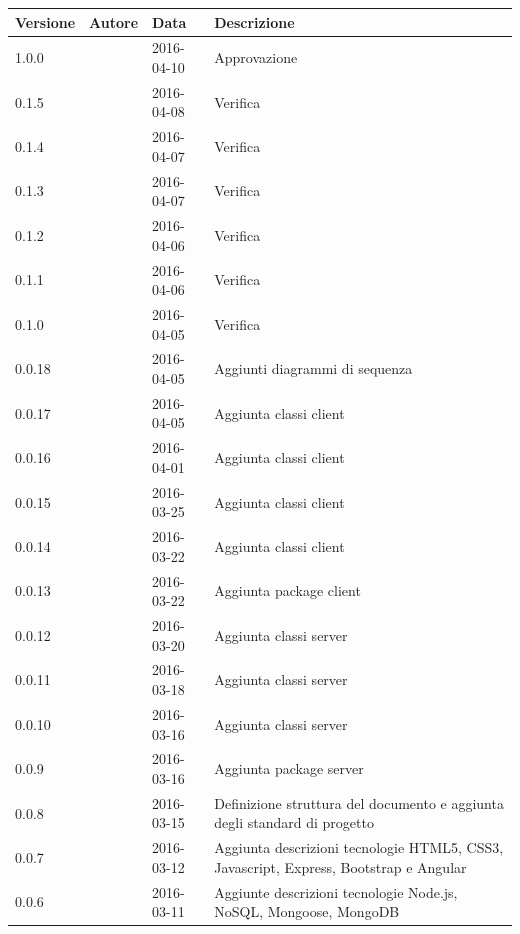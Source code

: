 \documentclass[12pt,a4paper]{article}
\begin{document}
\begin{center}
	\begin{longtable}[H]{p{} p{} p{} p{}}
		\toprule
		\textbf{Versione}	&	\textbf{Autore}	&	\textbf{Data}	&	\textbf{Descrizione}\\*
		\midrule
		\midrule
		1.0.0 & \TP & 2016-04-10 & Approvazione \\*
		\midrule
		0.1.5 & \NDC{} & 2016-04-08 & Verifica \\*
		\midrule
		0.1.4 & \WS{} & 2016-04-07 & Verifica \\*
		\midrule
		0.1.3 & \AVE{} & 2016-04-07 & Verifica \\*
		\midrule
		0.1.2 & \AVI{} & 2016-04-06 & Verifica \\*
		\midrule
		0.1.1 & \AB{} & 2016-04-06 & Verifica \\*
		\midrule
		0.1.0 & \IB{} & 2016-04-05 & Verifica \\*
		\midrule
		0.0.18 & \NDC{} & 2016-04-05 & Aggiunti diagrammi di sequenza \\*
		\midrule
		0.0.17 & \IB{} & 2016-04-05 & Aggiunta classi client \\*
		\midrule
		0.0.16 & \WS{} & 2016-04-01 & Aggiunta classi client \\*
		\midrule
		0.0.15 & \AB{} & 2016-03-25 & Aggiunta classi client \\*
		\midrule
		0.0.14 & \NDC{} & 2016-03-22 & Aggiunta classi client \\*
		\midrule
		0.0.13 & \NDC{} & 2016-03-22 & Aggiunta package client \\*
		\midrule
		0.0.12 & \AVE{} & 2016-03-20 & Aggiunta classi server \\*
		\midrule
		0.0.11 & \AVI{} & 2016-03-18 & Aggiunta classi server \\*
		\midrule
		0.0.10 & \TP{} & 2016-03-16 & Aggiunta classi server \\*
		\midrule
		0.0.9 & \TP{} & 2016-03-16 & Aggiunta package server \\*
        \midrule
        0.0.8 & \NDC{} & 2016-03-15 & Definizione struttura del documento e aggiunta
            degli standard di progetto \\*
		\midrule
		0.0.7 & \AVE{} & 2016-03-12 & Aggiunta descrizioni tecnologie HTML5, CSS3, Javascript, 
            Express, Bootstrap e Angular \\*
		\midrule
		0.0.6 & \AVE{} & 2016-03-11 & Aggiunte descrizioni tecnologie Node.js, NoSQL, Mongoose, MongoDB \\*

\end{longtable}
\end{center}
\end{document}
